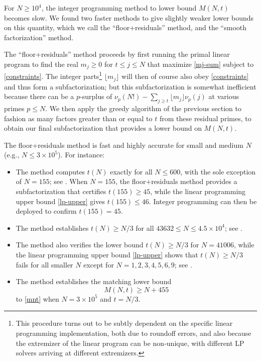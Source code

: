\documentclass[10pt,a4paper,reqno]{amsart}
\numberwithin{equation}{section}
\theoremstyle{plain}
\theoremstyle{definition}
\begin{document}
For $N \geq 10^4$, the integer programming method to lower bound $M(N,t)$ becomes slow.  We found two faster methods to give slightly weaker lower bounds on this quantity, which we call the ``floor+residuals'' method, and the ``smooth factorization'' method.

The ``floor+residuals'' method proceeds by first running the primal linear program to find the real $m_j \geq 0$ for $t \leq j \leq N$ that maximize \eqref{mj-sum} subject to \eqref{constraints}.  The integer parts\footnote{This procedure turns out to be subtly dependent on the specific linear programming implementation, both due to roundoff errors, and also because the extremizer of the linear program can be non-unique, with different LP solvers arriving at different extremizers.} $\lfloor m_j \rfloor$ will then of course also obey \eqref{constraints} and thus form a subfactorization; but this subfactorization is somewhat inefficient because there can be a $p$-surplus of $\nu_p(N!) - \sum_{j \geq t} \lfloor m_j \rfloor \nu_p(j)$ at various primes $p \leq N$.  We then apply the greedy algorithm of the previous section to fashion as many factors greater than or equal to $t$ from these residual primes, to obtain our final subfactorization that provides a lower bound on $M(N,t)$.

The floor+residuals method is fast and highly accurate for small and medium $N$ (e.g., $N \leq 3 \times 10^5$).  For instance:
\begin{itemize}
  \item The method computes $t(N)$ exactly for all $N \leq 600$, with the sole exception of $N=155$; see .  When $N=155$, the floor+residuals method provides a subfactorization that certifies $t(155) \geq 45$, while the linear programming upper bound \eqref{lp-upper} gives $t(155) \leq 46$.  Integer programming can then be deployed to confirm $t(155)=45$.
  \item The method establishes $t(N) \geq N/3$ for all $43632 \leq N \leq 4.5 \times 10^4$; see .
  \item The method also verifies the lower bound $t(N)\geq N/3$ for $N=41006$, while the linear programming upper bound \eqref{lp-upper} shows that $t(N) \geq N/3$ fails for all smaller $N$ except for $N=1,2,3,4,5,6,9$; see .
  \item The method establishes the matching lower bound
\begin{equation}\label{mnt-lower}
M(N,t) \geq N + 455
\end{equation}
to \eqref{mnt} when $N = 3 \times 10^5$ and $t=N/3$.
\end{itemize}
\end{document}
